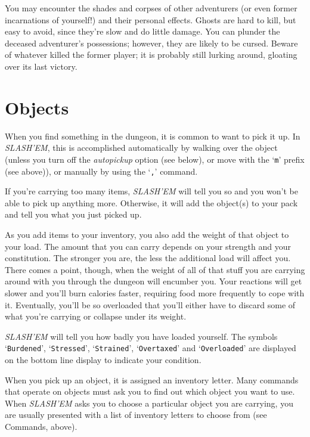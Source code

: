 
You may encounter the shades and corpses of other adventurers (or even
former incarnations of yourself!) and their personal effects.  Ghosts
are hard to kill, but easy to avoid, since they're slow and do little
damage.  You can plunder the deceased adventurer's possessions;
however, they are likely to be cursed.  Beware of whatever killed the
former player; it is probably still lurking around, gloating over its
last victory.

\section{Objects }


When you find something in the dungeon, it is common to want to pick
it up.  In {\it SLASH'EM}, this is accomplished automatically by walking over
the object (unless you turn off the
{\it autopickup\/} 
option (see below), or move with the `{\tt m}' prefix (see above)), or
manually by using the `{\tt ,}' command.

If you're carrying too many items, {\it SLASH'EM\/} will tell you so and you won't 
be able to pick
up anything more.  Otherwise, it will add the object(s) to your pack and tell
you what you just picked up.

As you add items to your inventory, you also add the weight of that object
to your load.  The amount that you can carry depends on your strength and
your constitution.  The
stronger you are, the less the additional load will affect you.  There comes
a point, though, when the weight of all of that stuff you are carrying around
with you through the dungeon will encumber you.  Your reactions
will get slower and you'll burn calories faster, requiring food more frequently
to cope with it.  Eventually, you'll be so overloaded that you'll either have
to discard some of what you're carrying or collapse under its weight.

{\it SLASH'EM\/} will tell you how badly you have loaded yourself.  The symbols
`{\tt Burdened}', `{\tt Stressed}', `{\tt Strained}', `{\tt Overtaxed}' and `{\tt Overloaded}' are
displayed on the bottom line display to indicate your condition.

When you pick up an object, it is assigned an inventory letter.  Many
commands that operate on objects must ask you to find out which object
you want to use.  When {\it SLASH'EM\/} asks you to choose a particular object
you are carrying, you are usually presented with a list of inventory
letters to choose from (see Commands, above).

